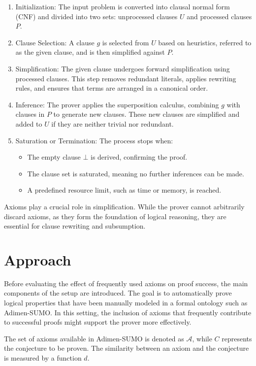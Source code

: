 \documentclass[english,version-2020-11]{uzl-thesis}
\begin{document}
\begin{enumerate}
    \item Initialization: The input problem is converted into clausal normal form (CNF) and divided into two sets: unprocessed clauses \( U \) and processed clauses \( P \).
    \item Clause Selection: A clause \( g \) is selected from \( U \) based on heuristics, referred to as the given clause, and is then simplified against \( P \).
    \item Simplification: The given clause undergoes forward simplification using processed clauses. This step removes redundant literals, applies rewriting rules, and ensures that terms are arranged in a canonical order.
    \item Inference: The prover applies the superposition calculus, combining \( g \) with clauses in \( P \) to generate new clauses. These new clauses are simplified and added to \( U \) if they are neither trivial nor redundant.
    \item Saturation or Termination: The process stops when:
    \begin{itemize}
        \item The empty clause \( \bot \) is derived, confirming the proof.
        \item The clause set is saturated, meaning no further inferences can be made.
        \item A predefined resource limit, such as time or memory, is reached.
    \end{itemize}
\end{enumerate}

Axioms play a crucial role in simplification. While the prover cannot arbitrarily discard axioms, as they form the foundation of logical reasoning, they are essential for clause rewriting and subsumption.


\section{Approach}

Before evaluating the effect of frequently used axioms on proof success, the main components of the setup are introduced. The goal is to automatically prove logical properties that have been manually modeled in a formal ontology such as Adimen-SUMO. In this setting, the inclusion of axioms that frequently contribute to successful proofs might support the prover more effectively.

The set of axioms available in Adimen-SUMO is denoted as \( \mathcal{A} \), while \( C \) represents the conjecture to be proven. The similarity between an axiom and the conjecture is measured by a function \( d \).
\end{document}
